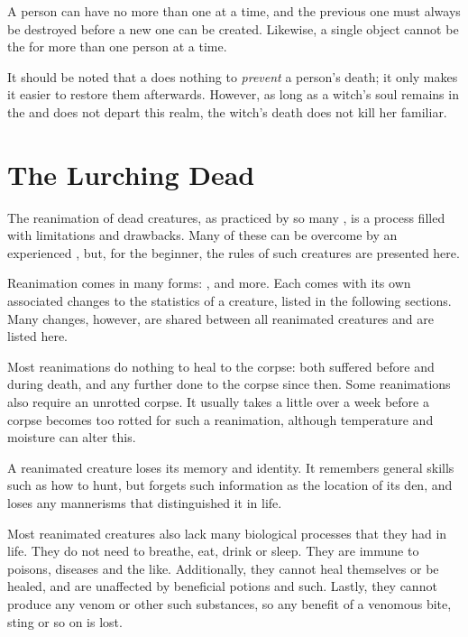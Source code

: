 A person can have no more than one {\phylactery} at a time, and the previous one must always be destroyed before a new one can be created.
Likewise, a single object cannot be the {\phylactery} for more than one person at a time.

It should be noted that a {\phylactery} does nothing to \emph{prevent} a person's death; it only makes it easier to restore them afterwards.
However, as long as a witch's soul remains in the {\phylactery} and does not depart this realm, the witch's death does not kill her familiar.

\section{The Lurching Dead}

The reanimation of dead creatures, as practiced by so many , is a process filled with limitations and drawbacks.
Many of these can be overcome by an experienced , but, for the beginner, the rules of such creatures are presented here.

Reanimation comes in many forms: ,  and more.
Each comes with its own associated changes to the statistics of a creature, listed in the following sections.
Many changes, however, are shared between all reanimated creatures and are listed here.

Most reanimations do nothing to heal {\damage} to the corpse: both {\damage} suffered before and during death, and any further {\damage} done to the corpse since then.
Some reanimations also require an unrotted corpse.
It usually takes a little over a week before a corpse becomes too rotted for such a reanimation, although temperature and moisture can alter this.

A reanimated creature loses its memory and identity.
It remembers general skills such as how to hunt, but forgets such information as the location of its den, and loses any mannerisms that distinguished it in life.

Most reanimated creatures also lack many biological processes that they had in life.
They do not need to breathe, eat, drink or sleep.
They are immune to poisons, diseases and the like.
Additionally, they cannot heal themselves or be healed, and are unaffected by beneficial potions and such.
Lastly, they cannot produce any venom or other such substances, so any benefit of a venomous bite, sting or so on is lost.

